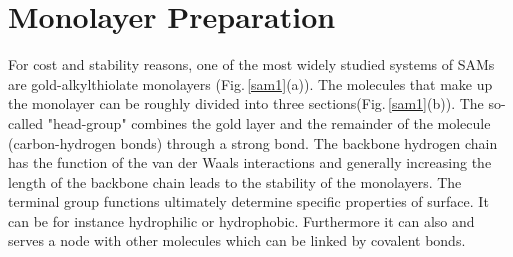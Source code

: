 \section{Monolayer Preparation}

For cost and stability reasons, one of the most widely studied systems of SAMs are gold-alkylthiolate monolayers (Fig.\,\ref{sam1}(a)).
The molecules that make up the monolayer can be roughly divided into three sections(Fig.\,\ref{sam1}(b)). The so-called "head-group" combines the gold layer and the remainder of the molecule (carbon-hydrogen bonds) through a strong bond. The backbone hydrogen chain has the function of the van der Waals interactions and generally increasing the length of the backbone chain leads to the stability of the monolayers.
The terminal group functions ultimately determine specific properties of surface. It can be for instance hydrophilic or hydrophobic. Furthermore it can also and serves a node with other molecules which can be linked by covalent bonds.



